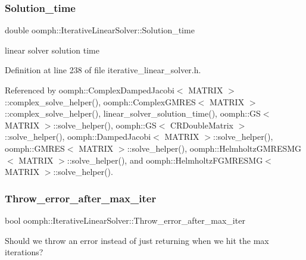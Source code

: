 \subsubsection{\texorpdfstring{Solution\+\_\+time}{Solution\_time}}
{\footnotesize\ttfamily double oomph\+::\+Iterative\+Linear\+Solver\+::\+Solution\+\_\+time\hspace{0.3cm}{\ttfamily [protected]}}



linear solver solution time 



Definition at line 238 of file iterative\+\_\+linear\+\_\+solver.\+h.



Referenced by oomph\+::\+Complex\+Damped\+Jacobi$<$ M\+A\+T\+R\+I\+X $>$\+::complex\+\_\+solve\+\_\+helper(), oomph\+::\+Complex\+G\+M\+R\+E\+S$<$ M\+A\+T\+R\+I\+X $>$\+::complex\+\_\+solve\+\_\+helper(), linear\+\_\+solver\+\_\+solution\+\_\+time(), oomph\+::\+G\+S$<$ M\+A\+T\+R\+I\+X $>$\+::solve\+\_\+helper(), oomph\+::\+G\+S$<$ C\+R\+Double\+Matrix $>$\+::solve\+\_\+helper(), oomph\+::\+Damped\+Jacobi$<$ M\+A\+T\+R\+I\+X $>$\+::solve\+\_\+helper(), oomph\+::\+G\+M\+R\+E\+S$<$ M\+A\+T\+R\+I\+X $>$\+::solve\+\_\+helper(), oomph\+::\+Helmholtz\+G\+M\+R\+E\+S\+M\+G$<$ M\+A\+T\+R\+I\+X $>$\+::solve\+\_\+helper(), and oomph\+::\+Helmholtz\+F\+G\+M\+R\+E\+S\+M\+G$<$ M\+A\+T\+R\+I\+X $>$\+::solve\+\_\+helper().

\mbox{\label{classoomph_1_1IterativeLinearSolver_a76284ada37aafb9ab39836907569c7b2}} 
\subsubsection{\texorpdfstring{Throw\+\_\+error\+\_\+after\+\_\+max\+\_\+iter}{Throw\_error\_after\_max\_iter}}
{\footnotesize\ttfamily bool oomph\+::\+Iterative\+Linear\+Solver\+::\+Throw\+\_\+error\+\_\+after\+\_\+max\+\_\+iter\hspace{0.3cm}{\ttfamily [protected]}}



Should we throw an error instead of just returning when we hit the max iterations? 



